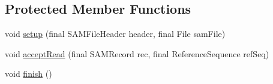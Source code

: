 \subsection*{Protected Member Functions}
\begin{DoxyCompactItemize}
\item 
void \hyperlink{classbroad_1_1pda_1_1seq_1_1rap_1_1rna_1_1_collect_rna_seq_metrics_a24459d7847405bc3114e24640edf7365}{setup} (final S\+A\+M\+File\+Header header, final File sam\+File)
\item 
void \hyperlink{classbroad_1_1pda_1_1seq_1_1rap_1_1rna_1_1_collect_rna_seq_metrics_a35dd5e2b2c2311bd54f36bd6667e0fd9}{accept\+Read} (final S\+A\+M\+Record rec, final Reference\+Sequence ref\+Seq)
\item 
void \hyperlink{classbroad_1_1pda_1_1seq_1_1rap_1_1rna_1_1_collect_rna_seq_metrics_a4a542a66a9438490e50a279cdc2ae0b2}{finish} ()
\end{DoxyCompactItemize}


